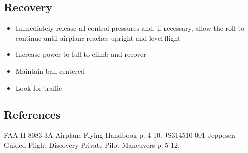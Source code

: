 \subsection{Recovery}

\begin{itemize}
  \item Immediately release all control pressures and, if necessary, allow the
    roll to continue until airplane reaches upright and level flight
  \item Increase power to full to climb and recover
  \item Maintain ball centered
  \item Look for traffic
\end{itemize}

\subsection{References}

FAA-H-8083-3A Airplane Flying Handbook p. 4-10.
JS314510-001 Jeppesen Guided Flight Discovery Private Pilot Maneuvers p. 5-12.

